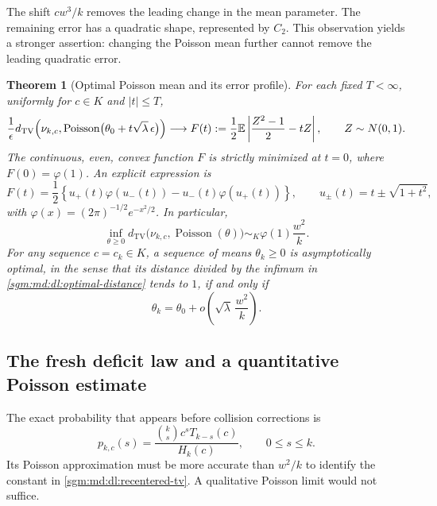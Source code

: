 \documentclass[11pt,letterpaper]{article}
\newtheorem{theorem}{Theorem}[section]
\theoremstyle{remark}\newtheorem{remark}[theorem]{Remark}
\newcommand{\Poi}{\operatorname{Poisson}}\newcommand{\Bin}{\operatorname{Bin}}
\theoremstyle{definition}\newtheorem{definition}[theorem]{Definition}
\newcommand{\TV}{d_{\mathrm{TV}}}
\begin{document}
The shift $cw^3/k$ removes the leading change in the mean parameter.
The remaining error has a quadratic shape, represented by $C_2$.
This observation yields a stronger assertion: changing the Poisson mean
further cannot remove the leading quadratic error.

\begin{theorem}[Optimal Poisson mean and its error profile]
\label{sgm:md:dl:optimal}
For each fixed $T<\infty$, uniformly for $c\in K$ and $|t|\le T$,
\begin{equation}\label{sgm:md:dl:profile}
 \frac{1}{\epsilon}
 \TV\!\left(\nu_{k,c},
       \Poi\bigl(\theta_0+t\sqrt\lambda\,\epsilon\bigr)\right)
 \longrightarrow
 F(t):=\frac12\E\left|
                \frac{Z^2-1}{2}-tZ\right|,
 \qquad Z\sim N(0,1).
\end{equation}
The continuous, even, convex function $F$ is strictly minimized at $t=0$,
where $F(0)=\varphi(1)$.  An explicit expression is
\begin{equation}\label{sgm:md:dl:profile-explicit}
 F(t)=\frac12\left\{
       u_+(t)\varphi(u_-(t))-u_-(t)\varphi(u_+(t))\right\},
 \qquad u_\pm(t)=t\pm\sqrt{1+t^2},
\end{equation}
with $\varphi(x)=(2\pi)^{-1/2}e^{-x^2/2}$.
In particular,
\begin{equation}\label{sgm:md:dl:optimal-distance}
 \inf_{\theta\ge0}\TV\bigl(\nu_{k,c},\Poi(\theta)\bigr)
 \sim_K\varphi(1)\frac{w^2}{k}.
\end{equation}
For any sequence $c=c_k\in K$, a sequence of means $\theta_k\ge0$ is
asymptotically optimal, in the sense that its distance divided by the
infimum in \eqref{sgm:md:dl:optimal-distance} tends to $1$, if and only if
\begin{equation}\label{sgm:md:dl:optimal-characterization}
 \theta_k=\theta_0+o\!\left(\sqrt\lambda\,\frac{w^2}{k}\right).
\end{equation}
\end{theorem}

\subsection{The fresh deficit law and a quantitative Poisson estimate}

The exact probability that appears before collision corrections is
\begin{equation}\label{sgm:md:dl:fresh}
 p_{k,c}(s)=\frac{\binom{k}{s}c^sT_{k-s}(c)}{H_k(c)},
 \qquad 0\le s\le k.
\end{equation}
Its Poisson approximation must be more accurate than $w^2/k$ to identify
the constant in \eqref{sgm:md:dl:recentered-tv}.  A qualitative Poisson limit
would not suffice.
\end{document}
